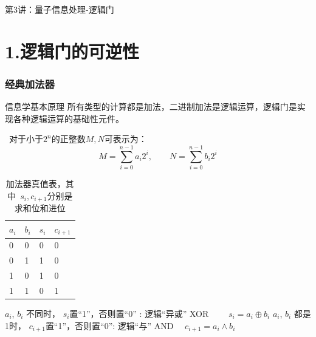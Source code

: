 

\begin{frame} [plain]
    \frametitle{}
    \Background[1] 
    \begin{center}
    {\huge 第3讲：量子信息处理-逻辑门}
    \end{center}  
    \addtocounter{framenumber}{-1}   
\end{frame}

\section{1.逻辑门的可逆性}

\begin{frame} 
    \frametitle{经典加法器}
    \begin{tcolorbox2}{信息学基本原理}
    所有类型的计算都是加法，二进制加法是逻辑运算，逻辑门是实现各种逻辑运算的基础性元件。
    \end{tcolorbox2}
    \解~对于小于$2^n$的正整数$M,N$可表示为：
    \[M=\sum_{i=0} ^{n-1} a_i 2^i,\qquad N=\sum_{i=0} ^{n-1} b_i 2^i\]
\end{frame} 

\begin{frame}    
    \begin{table}
        \caption{加法器真值表，其中 $s_i, c_{i+1}$分别是求和位和进位}
        \begin{tabular}{@{} llll @{}}
          $a_i$ & $b_i$ & $s_i$ & $c_{i+1}$\\
          \midrule
          0 & 0 & 0 & 0 \\
          0 & 1 & 1 & 0\\
          1 & 0 & 1 & 0\\
          1 & 1 & 0 & 1\\
          \bottomrule
        \end{tabular}
      \end{table}
    \begin{itemize}
        \IItem $a_i$, $b_i$ 不同时， $s_i$置“1”，否则置“0” : 逻辑“异或” XOR  $\qquad s_i=a_i\oplus b_i $
        \IItem $a_i$, $b_i$ 都是1时， $c_{i+1}$置“1”，否则置“0”:   逻辑“与” AND  $\quad c_{i+1}=a_i \wedge b_i $
    \end{itemize}
\end{frame} 

